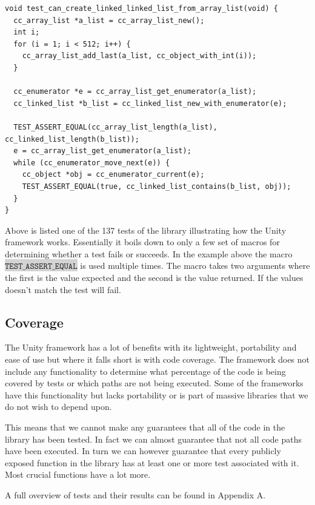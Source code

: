 \documentclass[table]{ituthesis}
\newcommand{\highlight}[1]{\colorbox{lightGray}{$\displaystyle \texttt{#1}$}}
\begin{document}
\begin{lstlisting}[label=test-example,caption=Example of unit test with Unity]
void test_can_create_linked_linked_list_from_array_list(void) {
  cc_array_list *a_list = cc_array_list_new();
  int i;
  for (i = 1; i < 512; i++) {
    cc_array_list_add_last(a_list, cc_object_with_int(i));
  }

  cc_enumerator *e = cc_array_list_get_enumerator(a_list);
  cc_linked_list *b_list = cc_linked_list_new_with_enumerator(e);

  TEST_ASSERT_EQUAL(cc_array_list_length(a_list), cc_linked_list_length(b_list));
  e = cc_array_list_get_enumerator(a_list);
  while (cc_enumerator_move_next(e)) {
    cc_object *obj = cc_enumerator_current(e);
    TEST_ASSERT_EQUAL(true, cc_linked_list_contains(b_list, obj));
  }
}
\end{lstlisting}

	Above is listed one of the 137 tests of the library illustrating how the Unity framework works. Essentially it boils down to only a few set of macros for determining whether a test fails or succeeds. In the example above the macro \highlight{TEST\_ASSERT\_EQUAL} is used multiple times. The macro takes two arguments where the first is the value expected and the second is the value returned. If the values doesn't match the test will fail.

	\subsection{Coverage}
	
	The Unity framework has a lot of benefits with its lightweight, portability and ease of use but where it falls short is with code coverage. The framework does not include any functionality to determine what percentage of the code is being covered by tests or which paths are not being executed. Some of the frameworks have this functionality but lacks portability or is part of massive libraries that we do not wish to depend upon.

	This means that we cannot make any guarantees that all of the code in the library has been tested. In fact we can almost guarantee that not all code paths have been executed. In turn we can however guarantee that every publicly exposed function in the library has at least one or more test associated with it. Most crucial functions have a lot more.

	A full overview of tests and their results can be found in Appendix A.
	
\end{document}
